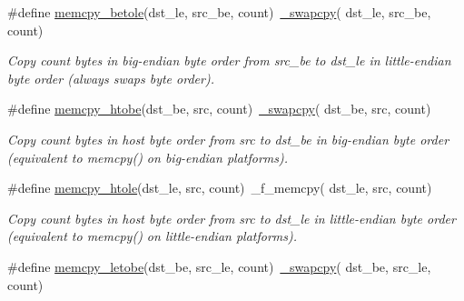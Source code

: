 \begin{DoxyCompactItemize}
\mbox{\label{group__util__byteorder_ga75cf1250c9f15ea3f0d87250c2b43a51}} 
\#define \hyperlink{group__util__byteorder_ga75cf1250c9f15ea3f0d87250c2b43a51}{memcpy\+\_\+betole}(dst\+\_\+le,  src\+\_\+be,  count)~\hyperlink{group__util__byteorder_ga23fd4d4005a80a26ff3c6ba23a4af560}{\+\_\+swapcpy}( dst\+\_\+le, src\+\_\+be, count)
\begin{DoxyCompactList}\small\item\em Copy {\itshape count} bytes in big-\/endian byte order from {\itshape src\+\_\+be} to {\itshape dst\+\_\+le} in little-\/endian byte order (always swaps byte order). \end{DoxyCompactList}\item 
\mbox{\label{group__util__byteorder_gaf0f22982f04251ea70fba1fb30d55ef5}} 
\#define \hyperlink{group__util__byteorder_gaf0f22982f04251ea70fba1fb30d55ef5}{memcpy\+\_\+htobe}(dst\+\_\+be,  src,  count)~\hyperlink{group__util__byteorder_ga23fd4d4005a80a26ff3c6ba23a4af560}{\+\_\+swapcpy}( dst\+\_\+be, src, count)
\begin{DoxyCompactList}\small\item\em Copy {\itshape count} bytes in host byte order from {\itshape src} to {\itshape dst\+\_\+be} in big-\/endian byte order (equivalent to memcpy() on big-\/endian platforms). \end{DoxyCompactList}\item 
\mbox{\label{group__util__byteorder_gaf677c5c03da581dab8015e8350750c00}} 
\#define \hyperlink{group__util__byteorder_gaf677c5c03da581dab8015e8350750c00}{memcpy\+\_\+htole}(dst\+\_\+le,  src,  count)~\+\_\+f\+\_\+memcpy( dst\+\_\+le, src, count)
\begin{DoxyCompactList}\small\item\em Copy {\itshape count} bytes in host byte order from {\itshape src} to {\itshape dst\+\_\+le} in little-\/endian byte order (equivalent to memcpy() on little-\/endian platforms). \end{DoxyCompactList}\item 
\mbox{\label{group__util__byteorder_gac8afbbc0aa0b7d35ebf38f54dbfbe6c2}} 
\#define \hyperlink{group__util__byteorder_gac8afbbc0aa0b7d35ebf38f54dbfbe6c2}{memcpy\+\_\+letobe}(dst\+\_\+be,  src\+\_\+le,  count)~\hyperlink{group__util__byteorder_ga23fd4d4005a80a26ff3c6ba23a4af560}{\+\_\+swapcpy}( dst\+\_\+be, src\+\_\+le, count)

\end{DoxyCompactItemize}
